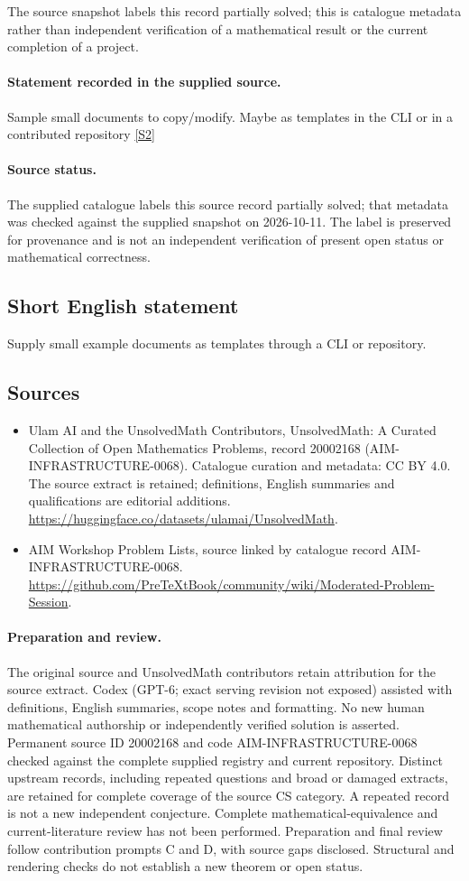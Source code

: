\documentclass[11pt]{article}
\begin{document}
The source snapshot labels this record partially solved; this is catalogue metadata rather than independent verification of a mathematical result or the current completion of a project.
\paragraph{Statement recorded in the supplied source.}
Sample small documents to copy/modify. Maybe as templates in the CLI or in a contributed repository \href{https://github.com/PreTeXtBook/community/wiki/Moderated-Problem-Session}{[S2]}
\paragraph{Source status.}
The supplied catalogue labels this source record partially solved; that metadata was checked against the supplied snapshot on 2026-10-11. The label is preserved for provenance and is not an independent verification of present open status or mathematical correctness.
\subsection{Short English statement}
Supply small example documents as templates through a CLI or repository.
\subsection{Sources}
\begin{itemize}
\item[S1] Ulam AI and the UnsolvedMath Contributors, UnsolvedMath: A Curated Collection of Open Mathematics Problems, record 20002168 (AIM-INFRASTRUCTURE-0068). Catalogue curation and metadata: CC BY 4.0. The source extract is retained; definitions, English summaries and qualifications are editorial additions.
\url{https://huggingface.co/datasets/ulamai/UnsolvedMath}.
\item[S2] AIM Workshop Problem Lists, source linked by catalogue record AIM-INFRASTRUCTURE-0068.
\url{https://github.com/PreTeXtBook/community/wiki/Moderated-Problem-Session}.
\end{itemize}
\paragraph{Preparation and review.}
The original source and UnsolvedMath contributors retain attribution for the source extract. Codex (GPT-6; exact serving revision not exposed) assisted with definitions, English summaries, scope notes and formatting. No new human mathematical authorship or independently verified solution is asserted. Permanent source ID 20002168 and code AIM-INFRASTRUCTURE-0068 checked against the complete supplied registry and current repository. Distinct upstream records, including repeated questions and broad or damaged extracts, are retained for complete coverage of the source CS category. A repeated record is not a new independent conjecture. Complete mathematical-equivalence and current-literature review has not been performed. Preparation and final review follow contribution prompts C and D, with source gaps disclosed. Structural and rendering checks do not establish a new theorem or open status.
\label{end:20002168}
\end{document}
